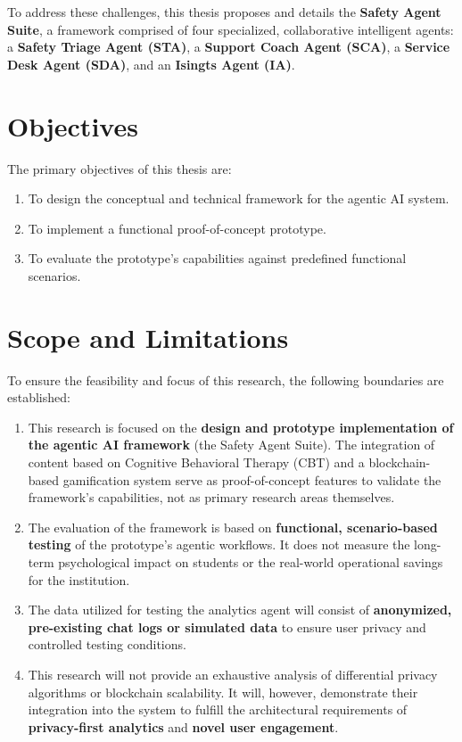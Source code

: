 To address these challenges, this thesis proposes and details the \textbf{Safety Agent Suite}, a framework comprised of four specialized, collaborative intelligent agents: a \textbf{Safety Triage Agent (STA)}, a \textbf{Support Coach Agent (SCA)}, a \textbf{Service Desk Agent (SDA)}, and an \textbf{Isingts Agent (IA)}.


\section{Objectives}
\label{sec:objectives}

The primary objectives of this thesis are:
\begin{enumerate}
    \item To design the conceptual and technical framework for the agentic AI system.
    \item To implement a functional proof-of-concept prototype.
    \item To evaluate the prototype's capabilities against predefined functional scenarios.
\end{enumerate}


\section{Scope and Limitations}
\label{sec:scope_and_limitations}

To ensure the feasibility and focus of this research, the following boundaries are established:

\begin{enumerate}
    \item This research is focused on the \textbf{design and prototype implementation of the agentic AI framework} (the Safety Agent Suite). The integration of content based on Cognitive Behavioral Therapy (CBT) and a blockchain-based gamification system serve as proof-of-concept features to validate the framework's capabilities, not as primary research areas themselves.

    \item The evaluation of the framework is based on \textbf{functional, scenario-based testing} of the prototype's agentic workflows. It does not measure the long-term psychological impact on students or the real-world operational savings for the institution.

    \item The data utilized for testing the analytics agent will consist of \textbf{anonymized, pre-existing chat logs or simulated data} to ensure user privacy and controlled testing conditions.

    \item This research will not provide an exhaustive analysis of differential privacy algorithms or blockchain scalability. It will, however, demonstrate their integration into the system to fulfill the architectural requirements of \textbf{privacy-first analytics} and \textbf{novel user engagement}.
\end{enumerate}

